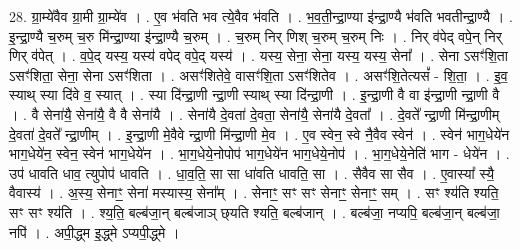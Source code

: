 \documentclass[17pt]{extarticle}
\begin{document}
28. ग्रा॒म्ये॑वैव ग्रा॒मी ग्रा॒म्ये॑व । . ए॒व भ॑वति भव त्ये॒वैव भ॑वति । . भ॒व॒ती॒न्द्रा॒ण्या इ॑न्द्रा॒ण्यै भ॑वति भवतीन्द्रा॒ण्यै । . इ॒न्द्रा॒ण्यै च॒रुम् च॒रु मि॑न्द्रा॒ण्या इ॑न्द्रा॒ण्यै च॒रुम् । . च॒रुम् निर् णिश् च॒रुम् च॒रुम् निः । . निर् व॑पेद् वपे॒न् निर् णिर् व॑पेत् । . व॒पे॒द् यस्य॒ यस्य॑ वपेद् वपे॒द् यस्य॑ । . यस्य॒ सेना॒ सेना॒ यस्य॒ यस्य॒ सेना᳚ । . सेना ऽसꣳ॑शि॒ता ऽसꣳ॑शिता॒ सेना॒ सेना ऽसꣳ॑शिता । . असꣳ॑शितेवे॒ वासꣳ॑शि॒ता ऽसꣳ॑शितेव । . असꣳ॑शि॒तेत्यसं᳚ - शि॒ता॒ । . इ॒व॒ स्याथ् स्या दि॑वे व॒ स्यात् । . स्या दि॑न्द्रा॒णी न्द्रा॒णी स्याथ् स्या दि॑न्द्रा॒णी । . इ॒न्द्रा॒णी वै वा इ॑न्द्रा॒णी न्द्रा॒णी वै । . वै सेना॑यै॒ सेना॑यै॒ वै वै सेना॑यै । . सेना॑यै दे॒वता॑ दे॒वता॒ सेना॑यै॒ सेना॑यै दे॒वता᳚ । . दे॒वते᳚ न्द्रा॒णी मि॑न्द्रा॒णीम् दे॒वता॑ दे॒वते᳚ न्द्रा॒णीम् । . इ॒न्द्रा॒णी मे॒वैवे न्द्रा॒णी मि॑न्द्रा॒णी मे॒व । . ए॒व स्वेन॒ स्वे नै॒वैव स्वेन॑ । . स्वेन॑ भाग॒धेये॑न भाग॒धेये॑न॒ स्वेन॒ स्वेन॑ भाग॒धेये॑न । . भा॒ग॒धेये॒नोपोप॑ भाग॒धेये॑न भाग॒धेये॒नोप॑ । . भा॒ग॒धेये॒नेति॑ भाग - धेये॑न । . उप॑ धावति धाव॒ त्युपोप॑ धावति । . धा॒व॒ति॒ सा सा धा॑वति धावति॒ सा । . सैवैव सा सैव । . ए॒वास्या᳚ स्यै॒ वैवास्य॑ । . अ॒स्य॒ सेनाꣳ॒॒ सेना॑ मस्यास्य॒ सेना᳚म् । . सेनाꣳ॒॒ सꣳ सꣳ सेनाꣳ॒॒ सेनाꣳ॒॒ सम् । . सꣳ श्य॑ति श्यति॒ सꣳ सꣳ श्य॑ति । . श्य॒ति॒ बल्ब॑जा॒न् बल्ब॑जाञ् छ्‌यति श्यति॒ बल्ब॑जान् । . बल्ब॑जा॒ नप्यपि॒ बल्ब॑जा॒न् बल्ब॑जा॒ नपि॑ । . अपी॒द्ध्म इ॒द्ध्मे ऽप्यपी॒द्ध्मे । \newline
\end{document}
